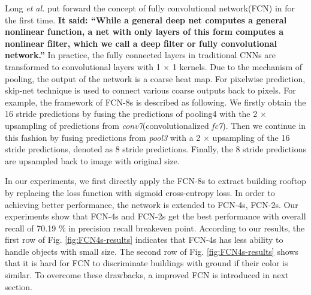 \documentclass[runningheads]{llncs}
\begin{document}
	Long \textit{et al.} put forward the concept of fully convolutional network(FCN) in \cite{Long2014Fully} for the first time. \textbf{It said: ``While a general deep net computes a general nonlinear function, a net with only layers of this form computes a nonlinear filter, which we call a deep filter or fully convolutional network.''} In practice, the fully connected layers in traditional CNNs are transformed to convolutional layers with 1 $\times$ 1 kernels. Due to the mechanism of pooling, the output of the network is a coarse heat map. For pixelwise prediction, skip-net technique is used to connect various coarse outputs back to pixels. For example, the framework of FCN-8s is described as following. We firstly obtain the 16 stride predictions by fusing the predictions of pooling4 with the 2 $\times$ upsampling of predictions from \textit{conv7}(convolutionalized \textit{fc7}). Then we continue in this fashion by fusing predictions from \textit{pool3} with a 2 $\times$ upsampling of the 16 stride predictions, denoted as 8 stride predictions. Finally, the 8 stride predictions are upsampled back to image with original size. 
	 
	In our experiments, we first directly apply the FCN-8s to extract building rooftop by replacing the loss function with sigmoid cross-entropy loss. In order to achieving better performance, the network is extended to FCN-4s, FCN-2s. Our experiments show that FCN-4s and FCN-2s get the best performance with overall recall of 70.19 $\%$ in precision recall breakeven point. According to our results, the first row of Fig. \ref{fig:FCN4s-results} indicates that FCN-4s has less ability to handle  objects with small size. The second row of Fig. \ref{fig:FCN4s-results} shows that it is hard for FCN to discriminate buildings with ground if their color is similar. To overcome these drawbacks, a improved FCN is introduced in next section. 
	
\end{document}
